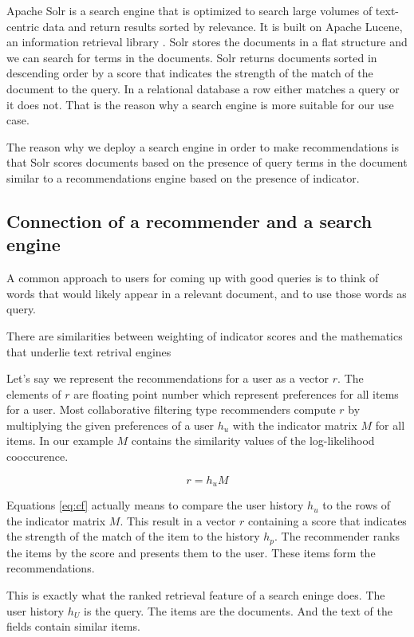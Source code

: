 Apache Solr is a search engine that is optimized to search large volumes of text-centric data and return results sorted by relevance. It is built on Apache Lucene, an information retrieval library \cite{grainger}. Solr stores the documents in a flat structure and we can search for terms in the documents.
Solr returns documents sorted in descending order by a score that indicates the strength of the match of the document to the query. In a relational database a row either matches a query or it does not. That is the reason why a search engine is more suitable for our use case.

The reason why we deploy a search engine in order to make recommendations is that Solr scores documents based on the presence of query terms in the document similar to a recommendations engine based on the presence of indicator.

\subsection{Connection of a recommender and a search engine}
\label{sec:relation}

A common approach to users for coming up with good queries is to think of words that would likely appear in a relevant document, and to use those words as query.

There are similarities between weighting of indicator scores and the mathematics that underlie text retrival engines

Let's say we represent the recommendations for a user as a vector $r$. The elements of $r$ are floating point number which represent preferences for all items for a user. Most collaborative filtering type recommenders compute $r$ by multiplying the given preferences of a user $h_u$ with the indicator matrix $M$ for all items. In our example $M$ contains the similarity values of the log-likelihood cooccurence.

\begin{equation}
  \label{eq:cf}
  r = h_u M
\end{equation}

Equations \ref{eq:cf} actually means to compare the user history $h_u$ to the rows of the indicator matrix $M$. This result in a vector $r$ containing a score that indicates the strength of the match of the item to the history $h_p$. The recommender ranks the items by the score and presents them to the user. These items form the recommendations.

This is exactly what the ranked retrieval feature of a search eninge does.
The user history $h_U$ is the query. The items are the documents. And the text of the fields contain similar items.

